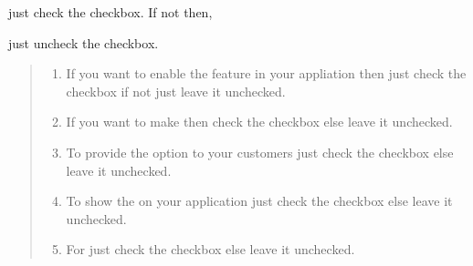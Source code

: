 \documentclass[a4paper,10pt,english]{report}
\begin{document}
just check  the checkbox. If not then,

just uncheck  the checkbox.
\begin{quote}
\begin{enumerate}
\def\theenumi{\arabic{enumi}}
\def\labelenumi{\theenumi .}
\makeatletter\def\p@enumii{\p@enumi \theenumi .}\makeatother
\setcounter{enumi}{14}
\item {} 
If you want to enable the  feature in your appliation then just check the checkbox if not just leave it unchecked.

\item {} 
If you want to make  then check the checkbox else leave it unchecked.

\item {} 
To provide the  option to your customers just check the checkbox else leave it unchecked.

\item {} 
To show the  on your application just check the checkbox else leave it unchecked.

\item {} 
For  just check the checkbox else leave it unchecked.

\end{enumerate}

\begin{figure}[htbp]
\centering

\noindent{}
\end{figure}
\end{quote}
\end{document}
